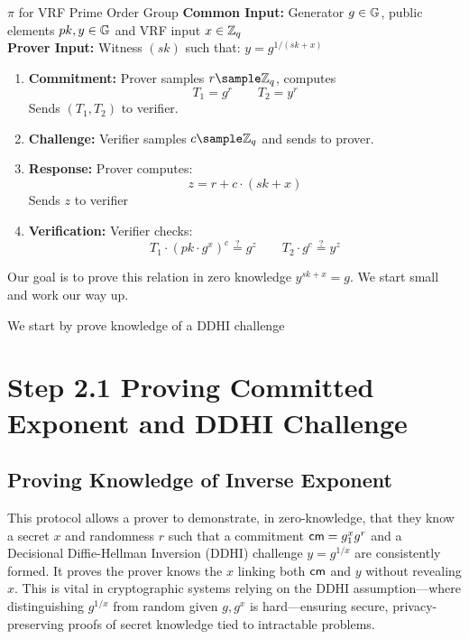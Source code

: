 \begin{protocol}{$\pi$ for VRF Prime Order Group}{}\label{pok-vrf-prime-order-group}
\textbf{Common Input:} Generator $g \in \mathbb{G}$, public elements $pk, y \in \mathbb{G}$ and VRF input $x \in \mathbb{Z}_q$\\
\textbf{Prover Input:} Witness $(sk)$ such that: $y = g^{1/(sk + x)}$
\begin{enumerate}
    \item \textbf{Commitment:} Prover samples $r \sample \Z_q$, computes 
    \[
    T_1 = g^r \qquad T_2 = y^r
    \]
    Sends $(T_1, T_2)$ to verifier.
    
    \item \textbf{Challenge:} Verifier samples $c \sample \mathbb{Z}_q$ and sends to prover.
    
    \item \textbf{Response:} Prover computes:
    \[
    z = r + c \cdot (sk + x)
    \]
    Sends $z$ to verifier
    
    \item \textbf{Verification:} Verifier checks:
    \[
    T_1 \cdot (pk \cdot g^x)^c \stackrel{?}{=} g^z \qquad T_2 \cdot g^c \stackrel{?}{=} y^z
    \]
 
\end{enumerate}
\end{protocol}


















Our goal is to prove this relation in zero knowledge $y^{sk+x} = g$. We start small and work our way up. 

We start by prove knowledge of a DDHI challenge


\section{Step 2.1 Proving Committed Exponent and DDHI Challenge}

\subsection*{Proving Knowledge of Inverse Exponent}
This protocol allows a prover to demonstrate, in zero-knowledge, that they know a secret $x$ and randomness $r$ such that a commitment $\mathsf{cm} = g_1^x g^r$ and a Decisional Diffie-Hellman Inversion (DDHI) challenge $y = g^{1/x}$ are consistently formed. It proves the prover knows the $x$ linking both $\mathsf{cm}$ and $y$ without revealing $x$. This is vital in cryptographic systems relying on the DDHI assumption—where distinguishing $g^{1/x}$ from random given $g, g^x$ is hard—ensuring secure, privacy-preserving proofs of secret knowledge tied to intractable problems.

